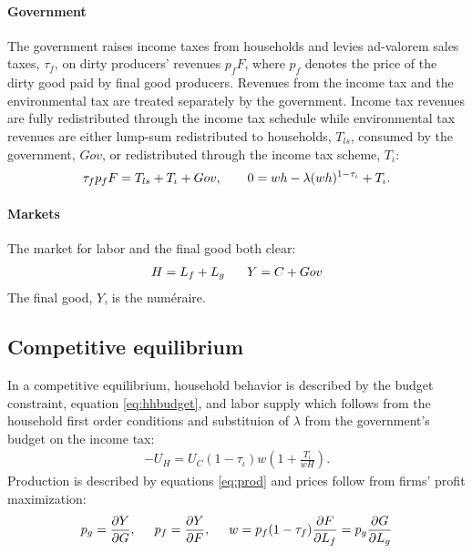 \paragraph{Government}
The government raises income taxes from households and levies ad-valorem sales taxes, $\tau_f$, on dirty producers' revenues $p_fF$, where $p_f$ denotes the price of the dirty good paid by final good producers. Revenues from the income tax and the environmental tax are treated separately by the government. Income tax revenues are fully redistributed through the income tax schedule while environmental tax revenues are either lump-sum redistributed to households, $T_{ls}$, consumed by the government, $Gov$, or redistributed through the income tax scheme, $T_\iota$:
\begin{align}
\tau_{f}p_fF=T_{ls}+T_\iota+Gov, \hspace{7mm}
0={w h}-\lambda(w h)^{1-\tau_{\iota}}+T_\iota. \label{eq:gov_but}
\end{align}

\paragraph{Markets}
The market for labor and the final good both clear: 
\begin{align}
H=L_f+L_g\ \hspace{5mm} Y=C+Gov \label{eq:market_clear}
\end{align}
 The final good, $Y$, is the numéraire.
\subsection{Competitive equilibrium}
In a competitive equilibrium, household behavior is described by the budget constraint, equation \ref{eq:hhbudget}, and labor supply which follows from the household first order conditions and substituion of $\lambda$ from the government's budget on the income tax:
\begin{align}
-U_H=U_C(1-\tau_{\iota})w\left(1+\frac{T_\iota}{wH}\right). \label{eq:hsup}
\end{align}
Production is described by equations \ref{eq:prod} and prices follow from firms' profit maximization:
\begin{align}
p_g=\frac{\partial Y}{\partial G}, \hspace{5mm}
p_f = \frac{\partial Y}{\partial F}, \hspace{5mm}
w= p_f(1-\tau_f)\frac{\partial F}{\partial L_f}=p_g\frac{\partial G}{\partial L_g}\label{eq:profmax}
\end{align}

